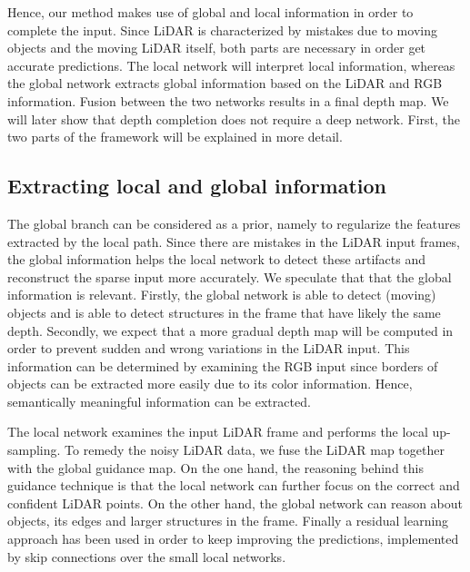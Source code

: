 \documentclass{main_style}
\begin{document}
Hence, our method makes use of global and local information in order to complete the input. Since LiDAR is characterized by mistakes due to moving objects and the moving LiDAR itself, both parts are necessary in order get accurate predictions. The local network will interpret local information, whereas the global network extracts global information based on the LiDAR and RGB information. Fusion between the two networks results in a final depth map. We will later show that depth completion does not require a deep network. First, the two parts of the framework will be explained in more detail.
\subsection{Extracting local and global information}
The global branch can be considered as a prior, namely to regularize the features extracted by the local path. Since there are mistakes in the LiDAR input frames, the global information helps the local network to detect these artifacts and reconstruct the sparse input more accurately. We speculate that that the global information is relevant. Firstly, the global network is able to detect (moving) objects and is able to detect structures in the frame that have likely the same depth. Secondly, we expect that a more gradual depth map will be computed in order to prevent sudden and wrong variations in the LiDAR input. This information can be determined by examining the RGB input since borders of objects can be extracted more easily due to its color information. Hence, semantically meaningful information can be extracted.

The local network examines the input LiDAR frame and performs the local up-sampling. To remedy the noisy LiDAR data, we fuse the LiDAR map together with the global guidance map. On the one hand, the reasoning behind this guidance technique is that the local network can further focus on the correct and confident LiDAR points. On the other hand, the global network can reason about objects, its edges and larger structures in the frame. Finally  a residual learning approach has been used in order to keep improving the predictions, implemented by skip connections over the small local networks.
\end{document}

